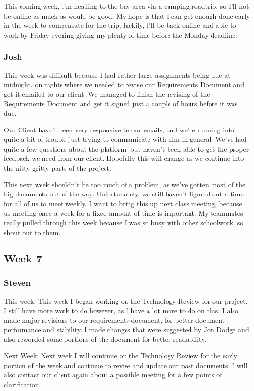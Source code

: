 \documentclass[onecolumn, draftclsnofoot,10pt, compsoc]{IEEEtran}
\begin{document}
This coming week, I'm heading to the bay area via a camping roadtrip, so I'll not be online as much as would be good. My hope is that I can get enough done early in the week to compensate for the trip; luckily, I'll be back online and able to work by Friday evening giving my plenty of time before the Monday deadline.

\subsubsection{Josh}

This week was difficult because I had rather large assignments being due at midnight, on nights where we needed to revise our Requirements Document and get it emailed to our client. We managed to finish the revising of the Requirements Document and get it signed just a couple of hours before it was due.

Our Client hasn't been very responsive to our emails, and we're running into quite a bit of trouble just trying to communicate with him in general. We've had quite a few questions about the platform, but haven't been able to get the proper feedback we need from our client. Hopefully this will change as we continue into the nitty-gritty parts of the project.

This next week shouldn't be too much of a problem, as we've gotten most of the big documents out of the way. Unfortunately, we still haven't figured out a time for all of us to meet weekly. I want to bring this up next class meeting, because us meeting once a week for a fixed amount of time is important. My teammates really pulled through this week because I was so busy with other schoolwork, so shout out to them.
\subsection{Week 7}
\subsubsection{Steven}

This week:
This week I began working on the Technology Review for our project. I still have more work to do however, as I have a lot more to do on this. I also made major revisions to our requirements document, for better document performance and stability. I made changes that were suggested by Jon Dodge and also reworded some portions of the document for better readability.

Next Week:
Next week I will continue on the Technology Review for the early portion of the week and continue to revise and update our past documents. I will also contact our client again about a possible meeting for a few points of clarification. 
\end{document}
